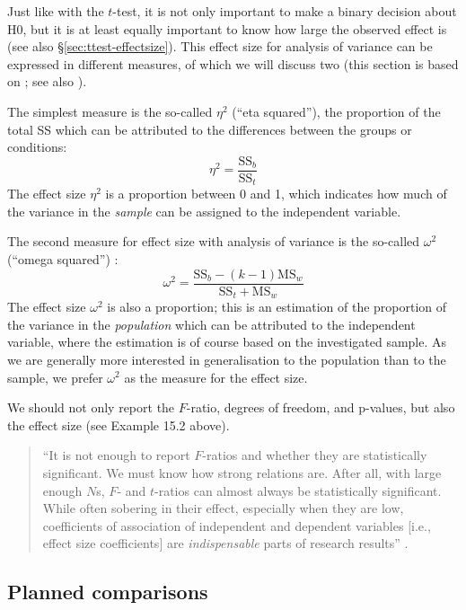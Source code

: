 \documentclass[
]{book}
\begin{document}
Just like with the \(t\)-test, it is not only important to make a binary decision
about H0, but it is at least equally important to know how large
the observed effect is (see also
§\ref{sec:ttest-effectsize}). This effect size for
analysis of variance can be expressed in different measures, of which we will
discuss two (this section is based on \citet{KL00}; see also \citet{Olej03}).

The simplest measure is the so-called \(\eta^2\) (``eta
squared''), the proportion of the total SS which can be attributed to the
differences between the groups or conditions: \[\label{eq:etasq}
    \eta^2 = \frac{ \textrm{SS}_b } { \textrm{SS}_t }\] The effect size
\(\eta^2\) is a proportion between 0 and 1, which indicates how much of the
variance in the \emph{sample} can be assigned to the independent
variable.

The second measure for effect size with analysis of variance is the so-called
\(\omega^2\) (``omega squared'') \citep[p.296]{MD04}:
\begin{equation}
  \label{eq:omegasq}
    \omega^2 = \frac{ \textrm{SS}_b - (k-1) \textrm{MS}_w} { \textrm{SS}_t + \textrm{MS}_w }
\end{equation}
The effect size \(\omega^2\) is also a proportion; this is an estimation
of the proportion of the variance in the \emph{population} which can be attributed
to the independent variable, where the estimation is of course based
on the investigated sample. As we are generally more interested in
generalisation to the population than to the sample, we prefer \(\omega^2\)
as the measure for the effect size.

We should not only report the \(F\)-ratio, degrees of freedom,
and p-values, but also the effect size (see
Example 15.2 above).

\begin{quote}
``It is not enough to report
\(F\)-ratios and whether they are statistically significant. We must know
how strong relations are. After all, with large enough \(N\)s, \(F\)- and
\(t\)-ratios can almost always be statistically significant. While often
sobering in their effect, especially when they are low, coefficients of
association of independent and dependent variables {[}i.e., effect size
coefficients{]} are \emph{indispensable} parts of research results'' \citep[ p.327, emphasis added]{KL00}.
\end{quote}

\hypertarget{sec:anova-oneway-planned}{%
\subsection{Planned comparisons}\label{sec:anova-oneway-planned}}
\end{document}
